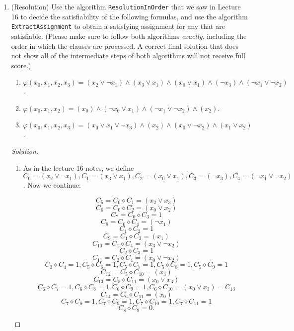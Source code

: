\documentclass[11pt]{article}
\begin{document}
\begin{enumerate}
\begin{proof}
\begin{enumerate}
\end{enumerate}
\end{proof}

\item (Resolution) Use the algorithm \texttt{ResolutionInOrder} that we saw in Lecture 16 to decide the satisfiability of the following formulas, and use the algorithm \texttt{ExtractAssignment} to obtain a satisfying assignment for any that are satisfiable. (Please make sure to follow both algorithms \textit{exactly}, including the order in which the clauses are processed. A correct final solution that does not show all of the intermediate steps of both algorithms will not receive full score.)
  
  \begin{enumerate}
      \item $\varphi(x_0, x_1, x_2, x_3) = (x_2 \vee \neg x_1) \wedge (x_3 \vee x_1) \wedge (x_0 \vee x_1) \wedge (\neg x_3) \wedge (\neg x_1 \vee \neg x_2)$.

      \item $\varphi(x_0, x_1, x_2) = (x_0) \wedge (\neg x_0 \vee x_1) \wedge (\neg x_1 \vee \neg x_2) \wedge (x_2)$.
      
      \item $\varphi(x_0, x_1, x_2, x_3) = (x_0 \vee x_1 \vee \neg x_3) \wedge (x_2) \wedge (x_0 \vee \neg x_2) \wedge (x_1 \vee x_2)$.

  \end{enumerate}
  
\begin{proof}[Solution]

\begin{enumerate}
\item As in the lecture 16 notes, we define $C_0 = (x_2 \vee \neg x_1), C_1 = (x_3 \vee x_1), C_2 = (x_0 \vee x_1), C_3 = (\neg x_3), C_4 = (\neg x_1 \vee \neg x_2)$. Now we continue:

$$
C_5 = C_0 \diamond C_1 = (x_2 \vee x_3)
$$ $$
C_6 = C_0 \diamond C_2 = (x_0 \vee x_2)
$$ $$
C_7 = C_0 \diamond C_3 = 1
$$ $$
C_8 = C_0 \diamond C_4 = (\neg x_1)
$$ $$
C_1 \diamond C_2 = 1
$$ $$
C_9 = C_1 \diamond C_3 = ( x_1 )
$$ $$
C_{10} = C_1 \diamond C_4 = (x_3 \vee \neg x_2 )
$$ $$
C_2 \diamond C_3 = 1
$$ $$
C_{11} = C_2 \diamond C_4 = (x_0 \vee \neg x_2 )
$$ $$
C_3 \diamond C_4 = 1, C_5 \diamond C_6 = 1, C_5 \diamond C_7 = 1, C_5 \diamond C_8 = 1, C_5 \diamond C_9 = 1
$$ $$
C_{12} = C_5 \diamond C_{10} = (x_3)
$$ $$
C_{13} = C_5 \diamond C_{11} = (x_0 \vee x_3)
$$ $$
C_6 \diamond C_7 = 1, C_6 \diamond C_8 = 1, C_6 \diamond C_9 = 1, C_6 \diamond C_{10} = (x_0 \vee x_3) = C_{13}
$$ $$
C_{14} = C_6 \diamond C_{11} = (x_0)
$$ $$
C_7 \diamond C_{8} = 1, C_7 \diamond C_{9} = 1, C_7 \diamond C_{10} = 1, C_7 \diamond C_{11} = 1
$$ $$
C_8 \diamond C_{9} = 0.
$$


\end{enumerate}
\end{proof}
\end{enumerate}
\end{document}
